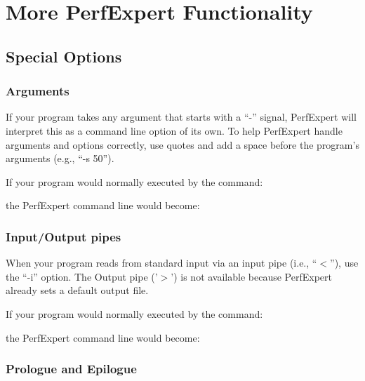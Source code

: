 \chapter{More PerfExpert Functionality}
\label{ch:ch05_more_perfexpert_functionality}

\section{Special Options}
\label{sec:Special_Options}

\subsection{Arguments}
\label{subsec:Arguments}

If your program takes any argument that starts with a ``-'' signal, PerfExpert will interpret this as a command line option of its own. To help PerfExpert handle arguments and options correctly, use quotes and add a space before the program's arguments (e.g., ``-s 50'').

If your program would normally executed by the command:
\begin{prompt}
\end{prompt}

the PerfExpert command line would become:
\begin{prompt}
\end{prompt}

\subsection{Input/Output pipes}
\label{subsec:IO_Pipes}

When your program reads from standard input via an input pipe (i.e., ``$<$''), use the ``-i'' option. The Output pipe ('$>$') is not available because PerfExpert already sets a default output file.

If your program would normally executed by the command:
\begin{prompt}
\end{prompt}

the PerfExpert command line would become:
\begin{prompt}
\end{prompt}

\subsection{Prologue and Epilogue}
\label{subsec:Prologue_Epilogue}

